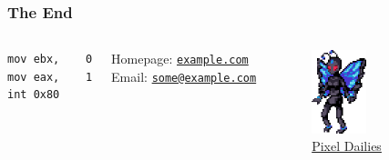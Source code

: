 \documentclass[10pt]{beamer}
\begin{document}
\begin{frame}[fragile]
\frametitle{The End}
\begin{columns}

\begin{verbatim}
mov ebx,    0
mov eax,    1
int 0x80
\end{verbatim}
\par
\vspace{2em}
Homepage: \href{http://example.com}{\tt example.com}\\
Email: \href{mailto:some@example.com}{\tt some@example.com}

\begin{figure}[ht]
    \includegraphics[width=0.5\textwidth]{insect.png}
    \caption{\href{https://twitter.com/Pixel_Dailies}{Pixel Dailies}}
\end{figure}
\end{columns}
\end{frame}  
\end{document}
